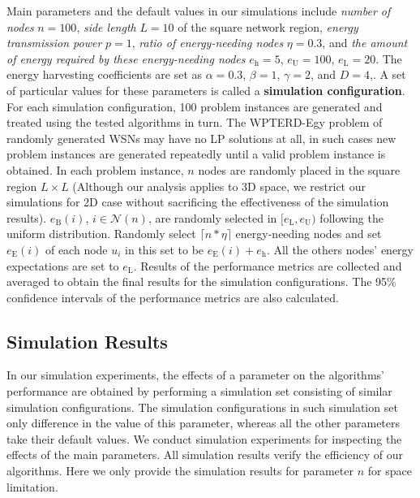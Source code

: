 \documentclass[journal,10pt]{IEEEtran}
\begin{document}
Main parameters and the default values in our simulations include \textit{number of nodes} $n{=}100$, \textit{side length} $L{=}10$ of the square network region, \textit{energy transmission power} $p{=}1$, \textit{ratio of energy-needing nodes} $\eta{=}0.3$, and \textit{the amount of energy required by these energy-needing nodes} $e_\text{h}{=}5$, $e_\text{U}{=}100$, $e_\text{L}{=}20$. The energy harvesting coefficients are set as $\alpha{=}0.3$, $\beta{=}1$, $\gamma{=}2$, and $D{=}4$,. A set of particular values for these parameters is called a \textbf{simulation configuration}. For each simulation configuration, 100 problem instances are generated and treated using the tested algorithms in turn. The WPTERD-Egy problem of randomly generated WSNs may have no LP solutions at all, in such cases new problem instances are generated repeatedly until a valid problem instance is obtained. In each problem instance, $n$ nodes are randomly placed in the square region $L{\times}L$ (Although our analysis applies to 3D space, we restrict our simulations for 2D case without sacrificing the effectiveness of the simulation results). $e_\text{B}(i)$, $i{\in}\mathcal{N}(n)$, are randomly selected in $[e_\text{L},e_\text{U})$ following the uniform distribution. Randomly select ${\lceil}n{*}\eta{\rceil}$ energy-needing nodes and set $e_\text{E}(i)$ of each node $u_i$ in this set to be $e_\text{E}(i){+}e_\text{h}$. All the others nodes' energy expectations are set to $e_\text{L}$. Results of the performance metrics are collected and averaged to obtain the final results for the simulation configurations. The 95\% confidence intervals of the performance metrics are also calculated.

\subsection{Simulation Results}

In our simulation experiments, the effects of a parameter on the algorithms' performance are obtained by performing a simulation set consisting of similar simulation configurations. The simulation configurations in such simulation set only difference in the value of this parameter, whereas all the other parameters take their default values. We conduct simulation experiments for inspecting the effects of the main parameters. All simulation results verify the efficiency of our algorithms. Here we only provide the simulation results for parameter $n$ for space limitation.
\end{document}
